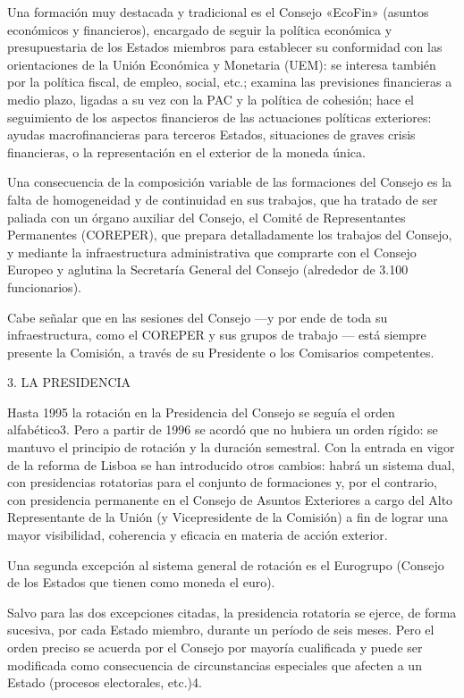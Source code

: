 \documentclass[10pt,a4paper]{article}
\begin{document}
Una formación muy destacada y tradicional es el Consejo «EcoFin» (asuntos económicos y financieros), encargado de seguir la política económica y presupuestaria de los Estados miembros para establecer su conformidad con las orientaciones de la Unión Económica y Monetaria (UEM): se interesa también por la política fiscal, de empleo, social, etc.; examina las previsiones financieras a medio plazo, ligadas a su vez con la PAC y la política de cohesión; hace el seguimiento de los aspectos financieros de las actuaciones políticas exteriores: ayudas macrofinancieras para terceros Estados, situaciones de graves crisis financieras, o la representación en el exterior de la moneda única.

Una consecuencia de la composición variable de las formaciones del Consejo es la falta de homogeneidad y de continuidad en sus trabajos, que ha tratado de ser paliada con un órgano auxiliar del Consejo, el Comité de Representantes Permanentes (COREPER), que prepara detalladamente los trabajos del Consejo, y mediante la infraestructura administrativa que comprarte con el Consejo Europeo y aglutina la Secretaría General del Consejo (alrededor de 3.100 funcionarios). 

Cabe señalar que en las sesiones del Consejo —y por ende de toda su infraestructura, como el COREPER y sus grupos de trabajo — está siempre presente la Comisión, a través de su Presidente o los Comisarios competentes.

3. LA PRESIDENCIA 

Hasta 1995 la rotación en la Presidencia del Consejo se seguía el orden alfabético3. Pero a partir de 1996 se acordó que no hubiera un orden rígido: se mantuvo el principio de rotación y la duración semestral. Con la entrada en vigor de la reforma de Lisboa se han introducido otros cambios: habrá un sistema dual, con presidencias rotatorias para el conjunto de formaciones y, por el contrario, con presidencia permanente en el Consejo de Asuntos Exteriores a cargo del Alto Representante de la Unión (y Vicepresidente de la Comisión) a fin de lograr una mayor visibilidad, coherencia y eficacia en materia de acción exterior.

Una segunda excepción al sistema general de rotación es el Eurogrupo (Consejo de los Estados que tienen como moneda el euro).

Salvo para las dos excepciones citadas, la presidencia rotatoria se ejerce, de forma sucesiva, por cada Estado miembro, durante un período de seis meses. Pero el orden preciso se acuerda por el Consejo por mayoría cualificada y puede ser modificada como consecuencia de circunstancias especiales que afecten a un Estado (procesos electorales, etc.)4.
\end{document}
